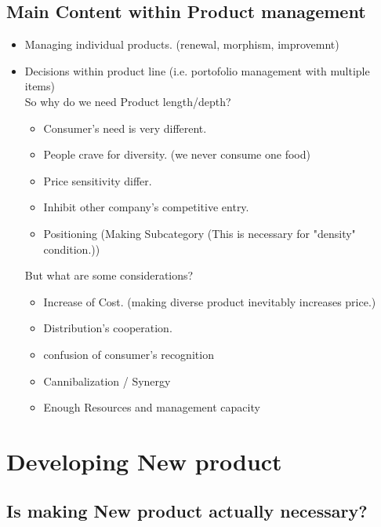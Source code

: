 \documentclass[12pt]{article}
\begin{document}
\subsection{Main Content within Product management}
\begin{itemize}
	\item Managing individual products.  (renewal, morphism, improvemnt)
	\item Decisions within product line (i.e. portofolio management with multiple items) \\
	So why do we need  Product length/depth?
	\begin{itemize}
		\item Consumer's need is very different.
		\item People crave for diversity. (we never consume one food)
		\item Price sensitivity differ.
		\item Inhibit other company's competitive entry.
		\item Positioning (Making Subcategory (This is necessary for "density" condition.))
	\end{itemize}

	But what are some considerations?

	\begin{itemize}
		\item Increase of Cost. (making diverse product inevitably increases price.)
		\item Distribution's cooperation.
		\item confusion of consumer's recognition
		\item Cannibalization / Synergy
		\item Enough Resources and management capacity

	\end{itemize}
\end{itemize}

\section{Developing New product}

\subsection{Is making New product actually necessary?}
\end{document}
